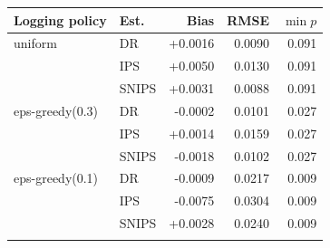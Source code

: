 \begin{tabular}{llrrr}
\toprule
Logging policy & Est. & Bias & RMSE & $\min p$ \\
\midrule
uniform & DR & +0.0016 & 0.0090 & 0.091 \\
 & IPS & +0.0050 & 0.0130 & 0.091 \\
 & SNIPS & +0.0031 & 0.0088 & 0.091 \\
\addlinespace
eps-greedy(0.3) & DR & -0.0002 & 0.0101 & 0.027 \\
 & IPS & +0.0014 & 0.0159 & 0.027 \\
 & SNIPS & -0.0018 & 0.0102 & 0.027 \\
\addlinespace
eps-greedy(0.1) & DR & -0.0009 & 0.0217 & 0.009 \\
 & IPS & -0.0075 & 0.0304 & 0.009 \\
 & SNIPS & +0.0028 & 0.0240 & 0.009 \\
\addlinespace
\bottomrule
\end{tabular}